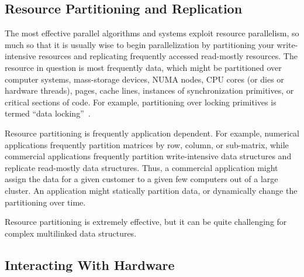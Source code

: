 \QuickQuizEnd

\subsection{Resource Partitioning and Replication}
\label{sec:Resource Partitioning and Replication}

The most effective parallel algorithms and systems exploit resource
parallelism, so much so that it is
usually wise to begin parallelization by partitioning your write-intensive
resources and replicating frequently accessed read-mostly resources.
The resource in question is most frequently data, which might be
partitioned over computer systems, mass-storage devices, NUMA nodes,
CPU cores (or dies or hardware threads), pages, cache lines, instances
of synchronization primitives, or critical sections of code.
For example, partitioning over locking primitives is termed
``data locking''~\cite{Beck85}.

Resource partitioning is frequently application dependent.
For example, numerical applications frequently partition matrices
by row, column, or sub-matrix, while commercial applications frequently
partition write-intensive data structures and replicate
read-mostly data structures.
Thus, a commercial application might assign the data for a
given customer to a given few computers out of a large cluster.
An application might statically partition data, or dynamically
change the partitioning over time.

Resource partitioning is extremely effective, but
it can be quite challenging for complex multilinked data
structures.

\subsection{Interacting With Hardware}
\label{sec:Interacting With Hardware}

